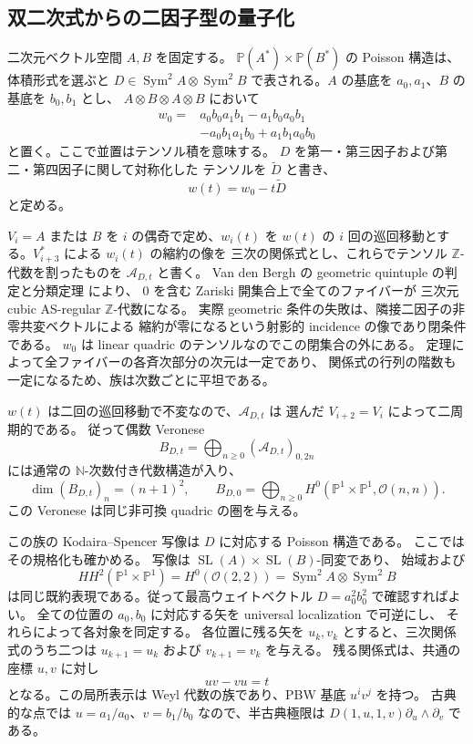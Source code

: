 \subsection{双二次式からの二因子型の量子化}
\label{subsec:quant-quadric}

二次元ベクトル空間 $A,B$ を固定する。
$\mathbb P(A^*)\times\mathbb P(B^*)$ の Poisson 構造は、
体積形式を選ぶと $D\in\operatorname{Sym}^2 A\otimes\operatorname{Sym}^2 B$
で表される。$A$ の基底を $a_0,a_1$、$B$ の基底を $b_0,b_1$ とし、
$A\otimes B\otimes A\otimes B$ において
\begin{align*}
 w_0={}&a_0b_0a_1b_1-a_1b_0a_0b_1\\
       &-a_0b_1a_1b_0+a_1b_1a_0b_0
\end{align*}
と置く。ここで並置はテンソル積を意味する。
$D$ を第一・第三因子および第二・第四因子に関して対称化した
テンソルを $\widetilde D$ と書き、
\[
                   w(t)=w_0-t\widetilde D
                   \tag{E3}
\]
と定める。

$V_i=A$ または $B$ を $i$ の偶奇で定め、$w_i(t)$ を $w(t)$ の
$i$ 回の巡回移動とする。$V_{i+3}^*$ による $w_i(t)$ の縮約の像を
三次の関係式とし、これらでテンソル $\mathbb Z$-代数を割ったものを
$\mathcal A_{D,t}$ と書く。
Van den Bergh の geometric quintuple の判定と分類定理
\cite[\S5.2、定理5.2.2、定義5.3.1、定理5.5.10]{VdBQuadrics} により、
$0$ を含む Zariski 開集合上で全てのファイバーが
三次元 cubic AS-regular $\mathbb Z$-代数になる。
実際 geometric 条件の失敗は、隣接二因子の非零共変ベクトルによる
縮約が零になるという射影的 incidence の像であり閉条件である。
$w_0$ は linear quadric のテンソルなのでこの閉集合の外にある。
定理によって全ファイバーの各斉次部分の次元は一定であり、
関係式の行列の階数も一定になるため、族は次数ごとに平坦である。

$w(t)$ は二回の巡回移動で不変なので、$\mathcal A_{D,t}$ は
選んだ $V_{i+2}=V_i$ によって二周期的である。
従って偶数 Veronese
\[
 B_{D,t}=\bigoplus_{n\geq0}(\mathcal A_{D,t})_{0,2n}
 \tag{E4}
\]
には通常の $\mathbb N$-次数付き代数構造が入り、
\[
 \dim(B_{D,t})_n=(n+1)^2,\qquad
 B_{D,0}=\bigoplus_{n\geq0}
 H^0(\mathbb P^1\times\mathbb P^1,\mathcal O(n,n)).
\]
この Veronese は同じ非可換 quadric の圏を与える。

この族の Kodaira--Spencer 写像は $D$ に対応する Poisson 構造である。
ここではその規格化も確かめる。
写像は $\operatorname{SL}(A)\times\operatorname{SL}(B)$-同変であり、
始域および
\[
 HH^2(\mathbb P^1\times\mathbb P^1)
 =H^0(\mathcal O(2,2))
 =\operatorname{Sym}^2A\otimes\operatorname{Sym}^2B
\]
は同じ既約表現である。従って最高ウェイトベクトル
$D=a_0^2b_0^2$ で確認すればよい。
全ての位置の $a_0,b_0$ に対応する矢を universal localization で可逆にし、
それらによって各対象を同定する。
各位置に残る矢を $u_k,v_k$ とすると、三次関係式のうち二つは
$u_{k+1}=u_k$ および $v_{k+1}=v_k$ を与える。
残る関係式は、共通の座標 $u,v$ に対し
\[
                         uv-vu=t
\]
となる。この局所表示は Weyl 代数の族であり、PBW 基底 $u^iv^j$ を持つ。
古典的な点では $u=a_1/a_0$、$v=b_1/b_0$ なので、半古典極限は
$D(1,u,1,v)\partial_u\wedge\partial_v$ である。

